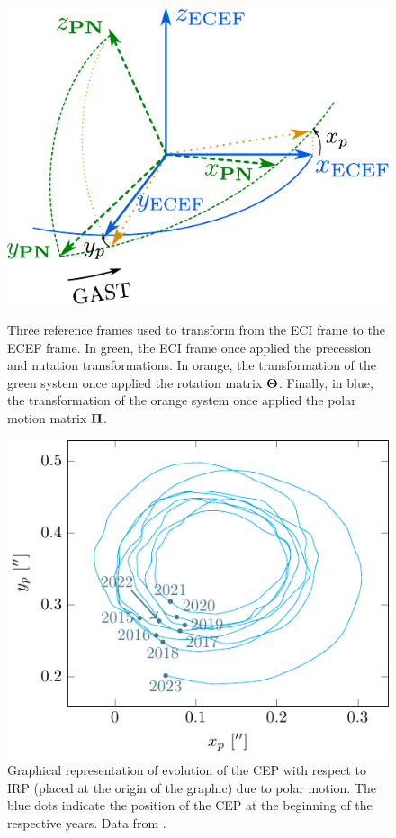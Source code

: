 \documentclass[../main.tex]{subfiles}
\begin{document}
\begin{figure}[htbp]
  \centering
  \begin{minipage}[ht]{0.45\textwidth}
    \centering
    \includegraphics[width=\textwidth]{Images/polar_motion_matrix.pdf}
    \caption{Three reference frames used to transform from the ECI frame to the ECEF frame. In green, the ECI frame once applied the precession and nutation transformations. In orange, the transformation of the green system once applied the rotation matrix $\boldsymbol{\mathrm{\Theta}}$. Finally, in blue, the transformation of the orange system once applied the polar motion matrix $\boldsymbol{\mathrm{\Pi}}$.}
    \label{fig:polar_motion_matrix}
  \end{minipage}
  \hspace{0.0333333\textwidth}
  \begin{minipage}[ht]{0.45\textwidth}
    \centering
    \includegraphics[width=\textwidth]{Images/polar_motion.pdf}
    \caption{Graphical representation of evolution of the CEP with respect to IRP (placed at the origin of the graphic) due to polar motion. The blue dots indicate the position of the CEP at the beginning of the respective years. Data from \cite{eop}.}
    \label{fig:polar_motion}
  \end{minipage}
\end{figure}
\end{document}
